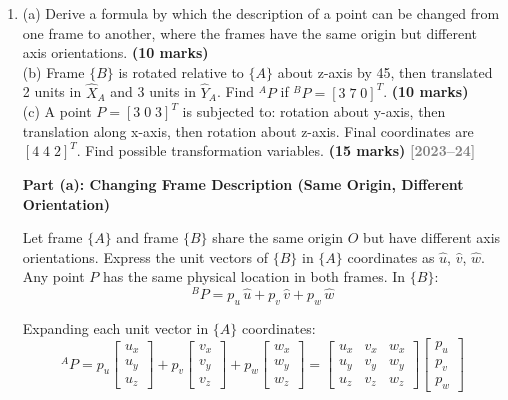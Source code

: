 \documentclass[12pt,a3paper]{article}
\newcommand{\yr}[1]{\hfill\textcolor{gray}{\small\textbf{[#1]}}}
\newcommand{\mk}[1]{\textcolor{orange!70!black}{\small\textbf{(#1 marks)}}}
\begin{document}
\begin{enumerate}
\item \label{qlabel:C2-Q1}
(a) Derive a formula by which the description of a point can be changed
from one frame to another, where the frames have the same origin but
different axis orientations. \mk{10}\\
(b) Frame $\{B\}$ is rotated relative to $\{A\}$ about z-axis by
45\textdegree, then translated 2 units in $\hat{X}_A$ and 3 units in
$\hat{Y}_A$. Find ${}^AP$ if ${}^BP = [3\;7\;0]^T$. \mk{10}\\
(c) A point $P = [3\;0\;3]^T$ is subjected to: rotation about y-axis,
then translation along x-axis, then rotation about z-axis. Final
coordinates are $[4\;4\;2]^T$. Find possible transformation
variables. \mk{15}
\yr{2023--24}

\begin{tcolorbox}[enhanced,breakable,ansbox,colback=cB!4,colframe=cB,
  boxrule=0.8pt,arc=5pt,
  title={\textbf{Answer}},fonttitle=\bfseries\color{white},
  colbacktitle=cB]

\textbf{Part (a): Changing Frame Description (Same Origin, Different
Orientation)}

\medskip
Let frame $\{A\}$ and frame $\{B\}$ share the same origin $O$ but have
different axis orientations. Express the unit vectors of $\{B\}$ in
$\{A\}$ coordinates as $\hat{u}$, $\hat{v}$, $\hat{w}$. Any point $P$
has the same physical location in both frames. In $\{B\}$:
\[
  {}^BP = p_u\,\hat{u} + p_v\,\hat{v} + p_w\,\hat{w}
\]

Expanding each unit vector in $\{A\}$ coordinates:
\[
  {}^AP
  = p_u\begin{bmatrix}u_x\\u_y\\u_z\end{bmatrix}
  + p_v\begin{bmatrix}v_x\\v_y\\v_z\end{bmatrix}
  + p_w\begin{bmatrix}w_x\\w_y\\w_z\end{bmatrix}
  = \begin{bmatrix}
      u_x & v_x & w_x\\
      u_y & v_y & w_y\\
      u_z & v_z & w_z
    \end{bmatrix}
    \begin{bmatrix}p_u\\p_v\\p_w\end{bmatrix}
\]


\end{tcolorbox}
\end{enumerate}
\end{document}
